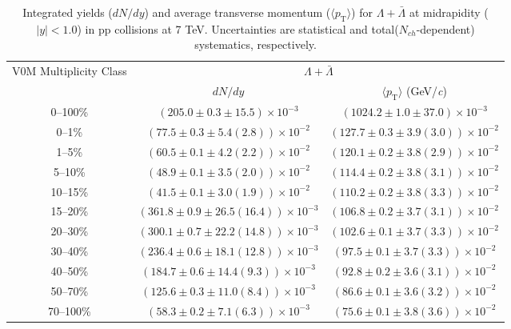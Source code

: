 \begin{table}
\caption{Integrated yields ($dN/dy$) and average transverse momentum ($\langle p_{\mathrm{T}} \rangle$) for $\Lambda + \bar{\Lambda}$ at midrapidity ($|y|<1.0$) in pp collisions at 7 TeV. Uncertainties are statistical and total($N_{ch}$-dependent) systematics, respectively.}
\label{tab:YieldMeanLambdaSum_}
\begin{center}
\begin{tabular}{ c | c c }
\hline
\multirow{2}{*}{V0M Multiplicity Class} & \multicolumn{2}{c}{$\Lambda + \bar{\Lambda}$} \\ 
& $dN/dy$ & $\langle p_{\mathrm{T}} \rangle$ (GeV/\textit{c})\\ 
\hline
0--100\% & $(205.0\pm0.3\pm15.5)\times10^{-3}$ & $(1024.2\pm1.0\pm37.0)\times10^{-3}$ \\ 
0--1\% & $(77.5\pm0.3\pm5.4(2.8))\times10^{-2}$ & $(127.7\pm0.3\pm3.9(3.0))\times10^{-2}$ \\ 
1--5\% & $(60.5\pm0.1\pm4.2(2.2))\times10^{-2}$ & $(120.1\pm0.2\pm3.8(2.9))\times10^{-2}$ \\ 
5--10\% & $(48.9\pm0.1\pm3.5(2.0))\times10^{-2}$ & $(114.4\pm0.2\pm3.8(3.1))\times10^{-2}$ \\ 
10--15\% & $(41.5\pm0.1\pm3.0(1.9))\times10^{-2}$ & $(110.2\pm0.2\pm3.8(3.3))\times10^{-2}$ \\ 
15--20\% & $(361.8\pm0.9\pm26.5(16.4))\times10^{-3}$ & $(106.8\pm0.2\pm3.7(3.1))\times10^{-2}$ \\ 
20--30\% & $(300.1\pm0.7\pm22.2(14.8))\times10^{-3}$ & $(102.6\pm0.1\pm3.7(3.3))\times10^{-2}$ \\ 
30--40\% & $(236.4\pm0.6\pm18.1(12.8))\times10^{-3}$ & $(97.5\pm0.1\pm3.7(3.3))\times10^{-2}$ \\ 
40--50\% & $(184.7\pm0.6\pm14.4(9.3))\times10^{-3}$ & $(92.8\pm0.2\pm3.6(3.1))\times10^{-2}$ \\ 
50--70\% & $(125.6\pm0.3\pm11.0(8.4))\times10^{-3}$ & $(86.6\pm0.1\pm3.6(3.2))\times10^{-2}$ \\ 
70--100\% & $(58.3\pm0.2\pm7.1(6.3))\times10^{-3}$ & $(75.6\pm0.1\pm3.8(3.6))\times10^{-2}$ \\ 
\hline
\end{tabular}
\end{center}
\end{table}
 
